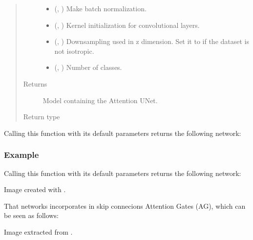 \documentclass[letterpaper,10pt,english]{sphinxmanual}
\begin{document}
\begin{fulllineitems}
\begin{quote}
\begin{description}
\begin{itemize}
\item {} 
 (, ) \textendash{} Make batch normalization.

\item {} 
 (, ) \textendash{} Kernel initialization for convolutional layers.

\item {} 
 (, ) \textendash{} Downsampling used in z dimension. Set it to  if the dataset is not isotropic.

\item {} 
 (, ) \textendash{} Number of classes.

\end{itemize}

\item[{Returns}] \leavevmode
{} \textendash{} Model containing the Attention U\sphinxhyphen{}Net.

\item[{Return type}] \leavevmode
{}

\end{description}\end{quote}

Calling this function with its default parameters returns the following network:
\subsubsection*{Example}

Calling this function with its default parameters returns the following network:


Image created with .

That networks incorporates in skip connecions Attention Gates (AG), which can be seen as follows:


Image extracted from .

\end{fulllineitems}
\end{document}
